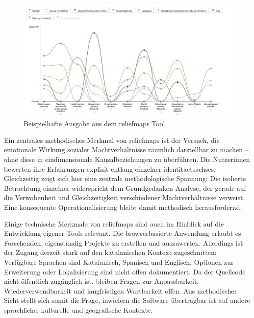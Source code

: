 \begin{figure}[htbp]
    \centering
    \includegraphics[width=\textwidth]{Arbeit/images/reliefmap.png}
    \caption{Beispielhafte Ausgabe aus dem \gls{reliefmaps} Tool}
    \label{fig:relief_maps_plus_screenshot_1}
\end{figure}

Ein zentrales methodisches Merkmal von \gls{reliefmaps} ist der Versuch, die emotionale Wirkung sozialer Machtverhältnisse räumlich darstellbar zu machen -- ohne diese in eindimensionale Kausalbeziehungen zu überführen. Die Nutzer\genderstern innen bewerten ihre Erfahrungen explizit entlang einzelner \glspl{identitaetsachse}. Gleichzeitig zeigt sich hier eine zentrale methodologische Spannung: Die isolierte Betrachtung einzelner  widerspricht dem Grundgedanken  Analyse, der gerade auf die Verwobenheit und Gleichzeitigkeit verschiedener Machtverhältnisse verweist. Eine konsequente  Operationalisierung bleibt damit methodisch herausfordernd.

Einige technische Merkmale von \gls{reliefmaps} sind auch im Hinblick auf die Entwicklung eigener Tools relevant. Die browserbasierte Anwendung erlaubt es Forschenden, eigenständig Projekte zu erstellen und auszuwerten. Allerdings ist der Zugang derzeit stark auf den katalanischen Kontext zugeschnitten: Verfügbare Sprachen sind Katalanisch, Spanisch und Englisch; Optionen zur Erweiterung oder Lokalisierung sind nicht offen dokumentiert. Da der Quellcode nicht öffentlich zugänglich ist, bleiben Fragen zur Anpassbarkeit, Wiederverwendbarkeit und langfristigen Wartbarkeit offen. Aus methodischer Sicht stellt sich somit die Frage, inwiefern die Software übertragbar ist auf andere sprachliche, kulturelle und geografische Kontexte.

